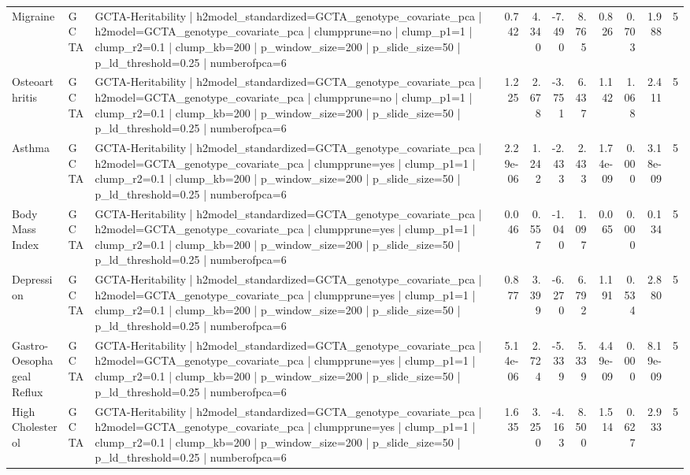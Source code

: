 \begin{landscape}
\begin{longtable}{p{2.4cm}p{1.8cm}p{6.0cm}rrrrrrrr}
Migraine & GCTA & GCTA-Heritability | h2model\_standardized=GCTA\_genotype\_covariate\_pca | h2model=GCTA\_genotype\_covariate\_pca | clumpprune=no | clump\_p1=1 | clump\_r2=0.1 | clump\_kb=200 | p\_window\_size=200 | p\_slide\_size=50 | p\_ld\_threshold=0.25 | numberofpca=6 & 0.742 & 4.340 & -7.490 & 8.765 & 0.826 & 0.703 & 1.988 & 5 \\
Osteoarthritis & GCTA & GCTA-Heritability | h2model\_standardized=GCTA\_genotype\_covariate\_pca | h2model=GCTA\_genotype\_covariate\_pca | clumpprune=no | clump\_p1=1 | clump\_r2=0.1 | clump\_kb=200 | p\_window\_size=200 | p\_slide\_size=50 | p\_ld\_threshold=0.25 | numberofpca=6 & 1.225 & 2.678 & -3.751 & 6.437 & 1.142 & 1.068 & 2.411 & 5 \\
Asthma & GCTA & GCTA-Heritability | h2model\_standardized=GCTA\_genotype\_covariate\_pca | h2model=GCTA\_genotype\_covariate\_pca | clumpprune=yes | clump\_p1=1 | clump\_r2=0.1 | clump\_kb=200 | p\_window\_size=200 | p\_slide\_size=50 | p\_ld\_threshold=0.25 | numberofpca=6 & 2.29e-06 & 1.242 & -2.433 & 2.433 & 1.74e-09 & 0.000 & 3.18e-09 & 5 \\
Body Mass Index & GCTA & GCTA-Heritability | h2model\_standardized=GCTA\_genotype\_covariate\_pca | h2model=GCTA\_genotype\_covariate\_pca | clumpprune=yes | clump\_p1=1 | clump\_r2=0.1 | clump\_kb=200 | p\_window\_size=200 | p\_slide\_size=50 | p\_ld\_threshold=0.25 | numberofpca=6 & 0.046 & 0.557 & -1.040 & 1.097 & 0.065 & 0.000 & 0.134 & 5 \\
Depression & GCTA & GCTA-Heritability | h2model\_standardized=GCTA\_genotype\_covariate\_pca | h2model=GCTA\_genotype\_covariate\_pca | clumpprune=yes | clump\_p1=1 | clump\_r2=0.1 | clump\_kb=200 | p\_window\_size=200 | p\_slide\_size=50 | p\_ld\_threshold=0.25 | numberofpca=6 & 0.877 & 3.399 & -6.270 & 6.792 & 1.191 & 0.534 & 2.880 & 5 \\
Gastro-Oesophageal Reflux & GCTA & GCTA-Heritability | h2model\_standardized=GCTA\_genotype\_covariate\_pca | h2model=GCTA\_genotype\_covariate\_pca | clumpprune=yes | clump\_p1=1 | clump\_r2=0.1 | clump\_kb=200 | p\_window\_size=200 | p\_slide\_size=50 | p\_ld\_threshold=0.25 | numberofpca=6 & 5.14e-06 & 2.724 & -5.339 & 5.339 & 4.49e-09 & 0.000 & 8.19e-09 & 5 \\
High Cholesterol & GCTA & GCTA-Heritability | h2model\_standardized=GCTA\_genotype\_covariate\_pca | h2model=GCTA\_genotype\_covariate\_pca | clumpprune=yes | clump\_p1=1 | clump\_r2=0.1 | clump\_kb=200 | p\_window\_size=200 | p\_slide\_size=50 | p\_ld\_threshold=0.25 | numberofpca=6 & 1.635 & 3.250 & -4.163 & 8.500 & 1.514 & 0.627 & 2.933 & 5 \\

\end{longtable}
\end{landscape}
